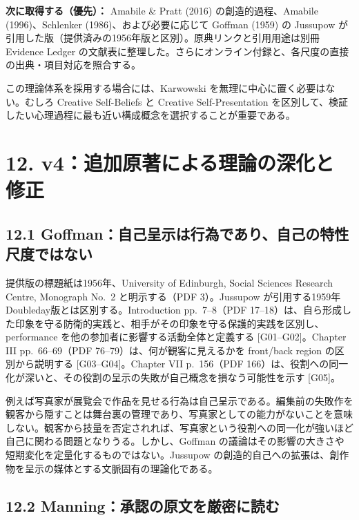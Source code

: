 \documentclass[
  11pt,
  a4paper,
]{article}
\begin{document}
\textbf{次に取得する（優先）：} Amabile \& Pratt (2016)
の創造的過程、Amabile (1996)、Schlenker (1986)、および必要に応じて
Goffman (1959) の Jussupow
が引用した版（提供済みの1956年版と区別）。原典リンクと引用用途は別冊
Evidence Ledger
の文献表に整理した。さらにオンライン付録と、各尺度の直接の出典・項目対応を照合する。

この理論体系を採用する場合には、Karwowski
を無理に中心に置く必要はない。むしろ Creative Self-Beliefs と Creative
Self-Presentation
を区別して、検証したい心理過程に最も近い構成概念を選択することが重要である。

\section{12.
v4：追加原著による理論の深化と修正}\label{v4ux8ffdux52a0ux539fux8457ux306bux3088ux308bux7406ux8ad6ux306eux6df1ux5316ux3068ux4feeux6b63}

\subsection{12.1
Goffman：自己呈示は行為であり、自己の特性尺度ではない}\label{goffmanux81eaux5df1ux5448ux793aux306fux884cux70baux3067ux3042ux308aux81eaux5df1ux306eux7279ux6027ux5c3aux5ea6ux3067ux306fux306aux3044}

提供版の標題紙は1956年、University of Edinburgh, Social Sciences
Research Centre, Monograph No.~2 と明示する（PDF 3）。Jussupow
が引用する1959年Doubleday版とは区別する。Introduction pp.~7--8（PDF
17--18）は、自ら形成した印象を守る防衛的実践と、相手がその印象を守る保護的実践を区別し、performance
を他の参加者に影響する活動全体と定義する {[}G01--G02{]}。Chapter III
pp.~66--69（PDF 76--79）は、何が観客に見えるかを front/back region
の区別から説明する {[}G03--G04{]}。Chapter VII p.~156（PDF
166）は、役割への同一化が深いと、その役割の呈示の失敗が自己概念を損なう可能性を示す
{[}G05{]}。

例えば写真家が展覧会で作品を見せる行為は自己呈示である。編集前の失敗作を観客から隠すことは舞台裏の管理であり、写真家としての能力がないことを意味しない。観客から技量を否定されれば、写真家という役割への同一化が強いほど自己に関わる問題となりうる。しかし、Goffman
の議論はその影響の大きさや短期変化を定量化するものではない。Jussupow
の創造的自己への拡張は、創作物を呈示の媒体とする文脈固有の理論化である。

\subsection{12.2
Manning：承認の原文を厳密に読む}\label{manningux627fux8a8dux306eux539fux6587ux3092ux53b3ux5bc6ux306bux8aadux3080}
\end{document}
